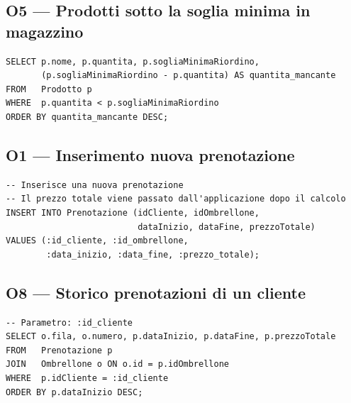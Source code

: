 \subsection{O5 --- Prodotti sotto la soglia minima in magazzino}

\begin{lstlisting}[caption={O5: Mancanze in magazzino}]
SELECT p.nome, p.quantita, p.sogliaMinimaRiordino,
       (p.sogliaMinimaRiordino - p.quantita) AS quantita_mancante
FROM   Prodotto p
WHERE  p.quantita < p.sogliaMinimaRiordino
ORDER BY quantita_mancante DESC;
\end{lstlisting}

\subsection{O1 --- Inserimento nuova prenotazione}

\begin{lstlisting}[caption={O1: Inserimento prenotazione con calcolo prezzo}]
-- Inserisce una nuova prenotazione
-- Il prezzo totale viene passato dall'applicazione dopo il calcolo
INSERT INTO Prenotazione (idCliente, idOmbrellone,
                          dataInizio, dataFine, prezzoTotale)
VALUES (:id_cliente, :id_ombrellone,
        :data_inizio, :data_fine, :prezzo_totale);
\end{lstlisting}

\subsection{O8 --- Storico prenotazioni di un cliente}

\begin{lstlisting}[caption={O8: Storico prenotazioni di un cliente}]
-- Parametro: :id_cliente
SELECT o.fila, o.numero, p.dataInizio, p.dataFine, p.prezzoTotale
FROM   Prenotazione p
JOIN   Ombrellone o ON o.id = p.idOmbrellone
WHERE  p.idCliente = :id_cliente
ORDER BY p.dataInizio DESC;
\end{lstlisting}
